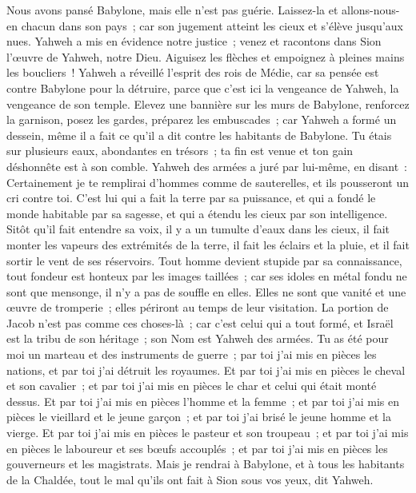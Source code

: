 \begin{multicols}{2}
Nous avons pansé Babylone, mais elle n'est pas guérie. Laissez-la et allons-nous-en chacun dans son pays~; car son jugement atteint les cieux et s'élève jusqu'aux nues.
Yahweh a mis en évidence notre justice~; venez et racontons dans Sion l'œuvre de Yahweh, notre Dieu.
Aiguisez les flèches et empoignez à pleines mains les boucliers~! Yahweh a réveillé l'esprit des rois de Médie, car sa pensée est contre Babylone pour la détruire, parce que c'est ici la vengeance de Yahweh, la vengeance de son temple.
Elevez une bannière sur les murs de Babylone, renforcez la garnison, posez les gardes, préparez les embuscades~; car Yahweh a formé un dessein, même il a fait ce qu'il a dit contre les habitants de Babylone.
Tu étais sur plusieurs eaux, abondantes en trésors~; ta fin est venue et ton gain déshonnête est à son comble.
Yahweh des armées a juré par lui-même, en disant~: Certainement je te remplirai d'hommes comme de sauterelles, et ils pousseront un cri contre toi.
C'est lui qui a fait la terre par sa puissance, et qui a fondé le monde habitable par sa sagesse, et qui a étendu les cieux par son intelligence.
Sitôt qu'il fait entendre sa voix, il y a un tumulte d'eaux dans les cieux, il fait monter les vapeurs des extrémités de la terre, il fait les éclairs et la pluie, et il fait sortir le vent de ses réservoirs.
Tout homme devient stupide par sa connaissance, tout fondeur est honteux par les images taillées~; car ses idoles en métal fondu ne sont que mensonge, il n'y a pas de souffle en elles.
Elles ne sont que vanité et une œuvre de tromperie~; elles périront au temps de leur visitation.
La portion de Jacob n'est pas comme ces choses-là~; car c'est celui qui a tout formé, et Israël est la tribu de son héritage~; son Nom est Yahweh des armées.
Tu as été pour moi un marteau et des instruments de guerre~; par toi j'ai mis en pièces les nations, et par toi j'ai détruit les royaumes.
Et par toi j'ai mis en pièces le cheval et son cavalier~; et par toi j'ai mis en pièces le char et celui qui était monté dessus.
Et par toi j'ai mis en pièces l'homme et la femme~; et par toi j'ai mis en pièces le vieillard et le jeune garçon~; et par toi j'ai brisé le jeune homme et la vierge.
Et par toi j'ai mis en pièces le pasteur et son troupeau~; et par toi j'ai mis en pièces le laboureur et ses bœufs accouplés~; et par toi j'ai mis en pièces les gouverneurs et les magistrats.
Mais je rendrai à Babylone, et à tous les habitants de la Chaldée, tout le mal qu'ils ont fait à Sion sous vos yeux, dit Yahweh.

\end{multicols}
